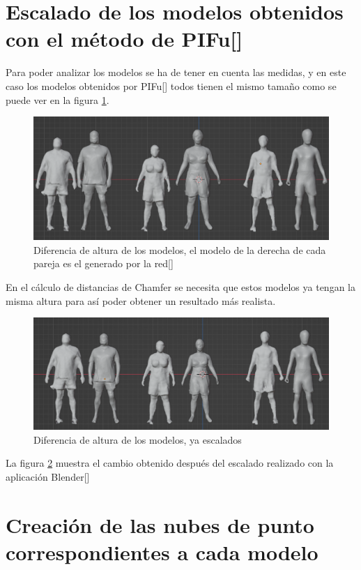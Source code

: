 \section{Escalado de los modelos obtenidos con el método de PIFu[\cite{pifu}]}

Para poder analizar los modelos se ha de tener en cuenta las medidas, y en este caso los modelos obtenidos por PIFu[\cite{pifu}] todos tienen el mismo tamaño como se puede ver en la figura \ref{fig:figura12}. 
\begin{figure}[H]
	\centering
	\includegraphics[scale=0.4]{imagenes/difaltura.png}
	\caption{Diferencia de altura de los modelos, el modelo de la derecha de cada pareja es el generado por la red[\cite{pifu}]}
	\label{fig:figura12}
\end{figure}

En el cálculo de distancias de Chamfer se necesita que estos modelos ya tengan la misma altura para así poder obtener un resultado más realista.
\begin{figure}[H]
	\centering
	\includegraphics[scale=0.4]{imagenes/difaltura1.png}
	\caption{Diferencia de altura de los modelos, ya escalados }
	\label{fig:figura13}
\end{figure}

La figura \ref{fig:figura13} muestra el cambio obtenido después del escalado realizado con la aplicación Blender[\cite{blender}]

\section{Creación de las nubes de punto correspondientes a cada modelo}

